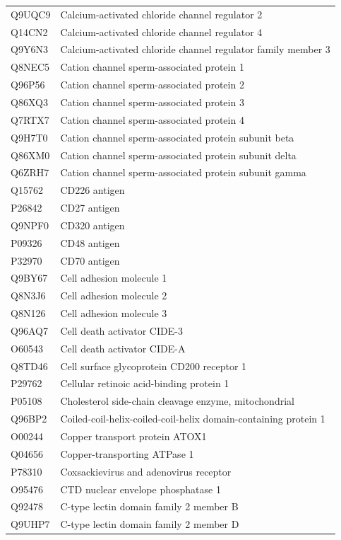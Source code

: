 \documentclass[10pt,twoside]{article}
\begin{document}
\begin{longtable}{lL{0.75\textwidth}}
Q9UQC9	&	Calcium-activated chloride channel regulator 2 	\\
Q14CN2	&	Calcium-activated chloride channel regulator 4 	\\
Q9Y6N3	&	Calcium-activated chloride channel regulator family member 3 	\\
Q8NEC5	&	Cation channel sperm-associated protein 1 	\\
Q96P56	&	Cation channel sperm-associated protein 2 	\\
Q86XQ3	&	Cation channel sperm-associated protein 3 	\\
Q7RTX7	&	Cation channel sperm-associated protein 4 	\\
Q9H7T0	&	Cation channel sperm-associated protein subunit beta 	\\
Q86XM0	&	Cation channel sperm-associated protein subunit delta 	\\
Q6ZRH7	&	Cation channel sperm-associated protein subunit gamma	\\
Q15762	&	CD226 antigen 	\\
P26842	&	CD27 antigen 	\\
Q9NPF0	&	CD320 antigen 	\\
P09326	&	CD48 antigen 	\\
P32970	&	CD70 antigen 	\\
Q9BY67	&	Cell adhesion molecule 1 	\\
Q8N3J6	&	Cell adhesion molecule 2 	\\
Q8N126	&	Cell adhesion molecule 3 	\\
Q96AQ7	&	Cell death activator CIDE-3 	\\
O60543	&	Cell death activator CIDE-A 	\\
Q8TD46	&	Cell surface glycoprotein CD200 receptor 1 	\\
P29762	&	Cellular retinoic acid-binding protein 1 	\\
P05108	&	Cholesterol side-chain cleavage enzyme, mitochondrial 	\\
Q96BP2	&	Coiled-coil-helix-coiled-coil-helix domain-containing protein 1 	\\
O00244	&	Copper transport protein ATOX1 	\\
Q04656	&	Copper-transporting ATPase 1 	\\
P78310	&	Coxsackievirus and adenovirus receptor 	\\
O95476	&	CTD nuclear envelope phosphatase 1 	\\
Q92478	&	C-type lectin domain family 2 member B 	\\
Q9UHP7	&	C-type lectin domain family 2 member D 	\\

\end{longtable}
\end{document}
